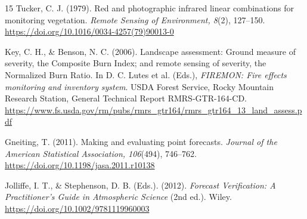 \documentclass[12pt,a4paper]{article}
\begin{document}
\begin{thebibliography}{15}
		Tucker, C. J. (1979). Red and photographic infrared linear combinations
		for monitoring vegetation. \textit{Remote Sensing of Environment, 8}(2), 127--150.
		\url{https://doi.org/10.1016/0034-4257(79)90013-0}
		
		Key, C. H., \& Benson, N. C. (2006). Landscape assessment: Ground measure
		of severity, the Composite Burn Index; and remote sensing of severity,
		the Normalized Burn Ratio. In D. C. Lutes et al. (Eds.),
		\textit{FIREMON: Fire effects monitoring and inventory system}.
		USDA Forest Service, Rocky Mountain Research Station, General Technical
		Report RMRS-GTR-164-CD.
		\url{https://www.fs.usda.gov/rm/pubs/rmrs_gtr164/rmrs_gtr164_13_land_assess.pdf}
		
		Gneiting, T. (2011). Making and evaluating point forecasts.
		\textit{Journal of the American Statistical Association, 106}(494), 746--762.
		\url{https://doi.org/10.1198/jasa.2011.r10138}
		
		Jolliffe, I. T., \& Stephenson, D. B. (Eds.). (2012).
		\textit{Forecast Verification: A Practitioner's Guide in Atmospheric Science}
		(2nd ed.). Wiley.
		\url{https://doi.org/10.1002/9781119960003}
		
	\end{thebibliography}
	
\end{document}
